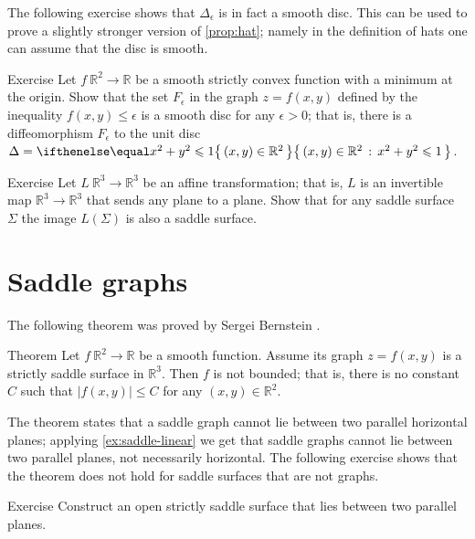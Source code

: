 The following exercise shows that $\Delta_\epsilon$ is in fact a smooth disc.
This can be used to prove a slightly stronger version of \ref{prop:hat};
namely in the definition of hats one can assume that the disc is smooth.

\begin{thm}{Exercise}\label{ex:disc-hat}
Let $f\:\mathbb{R}^2\to\mathbb{R}$ be a smooth strictly convex function with a minimum at the origin.
Show that the set $F_\epsilon$ in the graph $z=f(x,y)$ defined by the inequality $f(x,y)\le \epsilon$ is a smooth disc for any $\epsilon>0$;
that is, there is a diffeomorphism 
$F_\epsilon$ to the unit disc $\Delta\z=\set{(x,y)\in\mathbb{R}^2}{x^2+y^2\le 1}$.
\end{thm}

\begin{thm}{Exercise}\label{ex:saddle-linear}
Let $L\:\mathbb{R}^3\to\mathbb{R}^3$ be an affine transformation; that is, $L$ is an invertible map $\mathbb{R}^3\to\mathbb{R}^3$ that sends any plane to a plane. 
Show that for any saddle surface $\Sigma$ the image $L(\Sigma)$ is also a saddle surface.
\end{thm}


\section{Saddle graphs}

The following theorem was proved by Sergei Bernstein \cite{bernstein}.

\begin{thm}{Theorem}\label{thm:bernshtein}
Let $f\:\mathbb{R}^2\to\mathbb{R}$ be a smooth function.
Assume its graph $z=f(x,y)$ is a strictly saddle surface in $\mathbb{R}^3$.
Then $f$ is not bounded;
that is, there is no constant $C$ such that 
$|f(x,y)|\le C$ for any $(x,y)\in\mathbb{R}^2$.
\end{thm}

The theorem states that a saddle graph cannot lie between two parallel horizontal planes;
applying \ref{ex:saddle-linear} we get that saddle graphs cannot lie between two parallel planes,
not necessarily horizontal.
The following exercise shows that the theorem does not hold for saddle surfaces that are not graphs.


\begin{thm}{Exercise}\label{ex:between-parallels}
Construct an open strictly saddle surface that lies between two parallel planes.
\end{thm}

